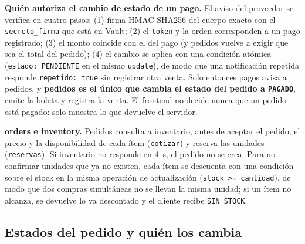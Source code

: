 \textbf{Quién autoriza el cambio de estado de un pago.} El aviso del proveedor se verifica en cuatro pasos: (1) firma HMAC-SHA256 del cuerpo exacto con el \texttt{secreto\_\allowbreak{}firma} que está en Vault; (2) el \texttt{token} y la orden corresponden a un pago registrado; (3) el monto coincide con el del pago (y pedidos vuelve a exigir que sea el total del pedido); (4) el cambio se aplica con una condición atómica (\texttt{estado:\allowbreak{} PENDIENTE} en el mismo \texttt{update}), de modo que una notificación repetida responde \texttt{repetido:\allowbreak{} true} sin registrar otra venta. Solo entonces pagos avisa a pedidos, y \textbf{pedidos es el único que cambia el estado del pedido a \texttt{PAGADO}}, emite la boleta y registra la venta. El frontend no decide nunca que un pedido está pagado: solo muestra lo que devuelve el servidor.


\textbf{orders e inventory.} Pedidos consulta a inventario, antes de aceptar el pedido, el precio y la disponibilidad de cada ítem (\texttt{cotizar}) y reserva las unidades (\texttt{reservas}). Si inventario no responde en 4~s, el pedido no se crea. Para no confirmar unidades que ya no existen, cada ítem se descuenta con una condición sobre el stock en la misma operación de actualización (\texttt{stock >=\allowbreak{} cantidad}), de modo que dos compras simultáneas no se llevan la misma unidad; si un ítem no alcanza, se devuelve lo ya descontado y el cliente recibe \texttt{SIN\_\allowbreak{}STOCK}.


\subsection{Estados del pedido y quién los cambia}


